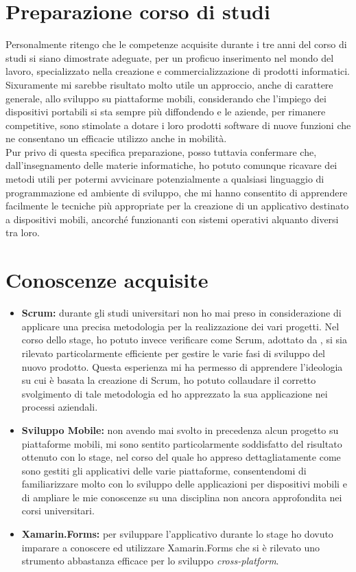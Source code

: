\section{Preparazione corso di studi}
Personalmente ritengo che le competenze acquisite durante i tre anni del corso di studi si siano dimostrate adeguate, per un proficuo inserimento nel mondo del lavoro, specializzato nella creazione e commercializzazione di prodotti informatici.
\\
Sixuramente mi sarebbe risultato molto utile un approccio, anche di carattere generale, allo sviluppo su piattaforme mobili, considerando che l'impiego dei dispositivi portabili si sta sempre più diffondendo e le aziende, per rimanere competitive, sono stimolate a dotare i loro prodotti software di nuove funzioni che ne consentano un efficacie utilizzo anche in mobilità.
\\
Pur privo di questa specifica preparazione, posso tuttavia confermare che, dall'insegnamento delle materie informatiche, ho potuto comunque ricavare dei metodi utili per potermi avvicinare potenzialmente a qualsiasi linguaggio di programmazione ed ambiente di sviluppo, che mi hanno consentito di apprendere facilmente le tecniche più appropriate per la creazione di un applicativo destinato a dispositivi mobili, ancorché funzionanti con sistemi operativi alquanto diversi tra loro.

\section{Conoscenze acquisite}
\begin{itemize}
	\item \textbf{Scrum:} durante gli studi universitari non ho mai preso in considerazione di applicare una precisa metodologia per la realizzazione dei vari progetti. Nel corso dello stage, ho potuto invece verificare come Scrum, adottato da \asi, si sia rilevato particolarmente efficiente per gestire le varie fasi di sviluppo del nuovo prodotto. Questa esperienza mi ha permesso di apprendere l'ideologia su cui è basata la creazione di Scrum, ho potuto collaudare il corretto svolgimento di tale metodologia ed ho apprezzato la sua applicazione nei processi aziendali.
	\item \textbf{Sviluppo Mobile:} non avendo mai svolto in precedenza alcun progetto su piattaforme mobili, mi sono sentito particolarmente soddisfatto del risultato ottenuto con lo stage, nel corso del quale ho appreso dettagliatamente come sono gestiti gli applicativi delle varie piattaforme, consentendomi di familiarizzare molto con lo sviluppo delle applicazioni per dispositivi mobili e di ampliare le mie conoscenze su una disciplina non ancora approfondita nei corsi universitari.
	\item \textbf{Xamarin.Forms:} per sviluppare l'applicativo durante lo stage ho dovuto imparare a conoscere ed utilizzare Xamarin.Forms che si è rilevato uno strumento abbastanza efficace per lo sviluppo \textit{cross-platform}.
\end{itemize}